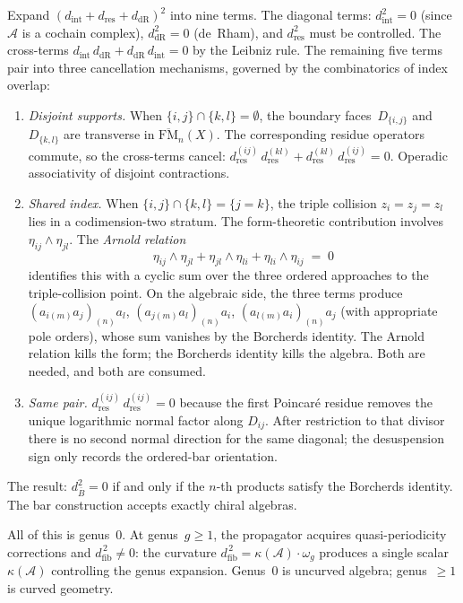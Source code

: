 \documentclass[11pt]{report}
\theoremstyle{definition}
\theoremstyle{remark}
\providecommand{\cA}{\mathcal{A}}
\providecommand{\barB}{\bar{B}}
\numberwithin{equation}{section}
\begin{document}
Expand $(d_{\mathrm{int}}+d_{\mathrm{res}}+d_{\mathrm{dR}})^2$
into nine terms. The diagonal terms: $d_{\mathrm{int}}^2=0$
(since~$\cA$ is a cochain complex), $d_{\mathrm{dR}}^2=0$
(de~Rham), and $d_{\mathrm{res}}^2$ must be controlled. The
cross-terms $d_{\mathrm{int}}\,d_{\mathrm{dR}}+
d_{\mathrm{dR}}\,d_{\mathrm{int}}=0$ by
the Leibniz rule. The remaining five terms pair into three
cancellation mechanisms, governed by the combinatorics of index
overlap:
\begin{enumerate}[label=(\alph*)]
\item \emph{Disjoint supports.}\; When $\{i,j\}\cap\{k,l\}
=\emptyset$, the boundary faces~$D_{\{i,j\}}$
and~$D_{\{k,l\}}$ are transverse in
$\overline{\mathrm{FM}}_n(X)$. The corresponding residue
operators commute, so the cross-terms cancel:
$d_{\mathrm{res}}^{(ij)}\,d_{\mathrm{res}}^{(kl)}
+d_{\mathrm{res}}^{(kl)}\,d_{\mathrm{res}}^{(ij)}=0$.
Operadic associativity of disjoint contractions.
\item \emph{Shared index.}\; When
$\{i,j\}\cap\{k,l\}=\{j=k\}$, the triple collision
$z_i=z_j=z_l$ lies in a codimension-two stratum. The
form-theoretic contribution involves
$\eta_{ij}\wedge\eta_{jl}$. The \emph{Arnold relation}
\[
\eta_{ij}\wedge\eta_{jl}
+\eta_{jl}\wedge\eta_{li}
+\eta_{li}\wedge\eta_{ij}
\;=\;0
\]
identifies this with a cyclic sum over the three ordered
approaches to the triple-collision point. On the algebraic
side, the three terms produce
$(a_{i(m)}a_j)_{(n)}a_l$, $(a_{j(m)}a_l)_{(n)}a_i$,
$(a_{l(m)}a_i)_{(n)}a_j$ (with appropriate pole orders),
whose sum vanishes by the Borcherds identity. The Arnold relation kills the form; the Borcherds identity
kills the algebra. Both are needed, and both are consumed.
\item \emph{Same pair.}\;
$d_{\mathrm{res}}^{(ij)}\,d_{\mathrm{res}}^{(ij)}=0$ because the first
Poincar\'e residue removes the unique logarithmic normal factor along
\(D_{ij}\).  After restriction to that divisor there is no second normal
direction for the same diagonal; the desuspension sign only records the
ordered-bar orientation.
\end{enumerate}

The result: $d_{\barB}^2=0$ if and only if the $n$-th products
satisfy the Borcherds identity. The bar construction accepts
exactly chiral algebras.

All of this is genus~$0$. At genus~$g \geq 1$, the propagator acquires
quasi-periodicity corrections and $d_{\mathrm{fib}}^{\,2} \neq 0$:
the curvature $d_{\mathrm{fib}}^{\,2} = \kappa(\cA) \cdot \omega_g$
produces a single scalar $\kappa(\cA)$ controlling the genus
expansion. Genus~$0$ is uncurved algebra;
genus~$\geq 1$ is curved geometry.
\end{document}
